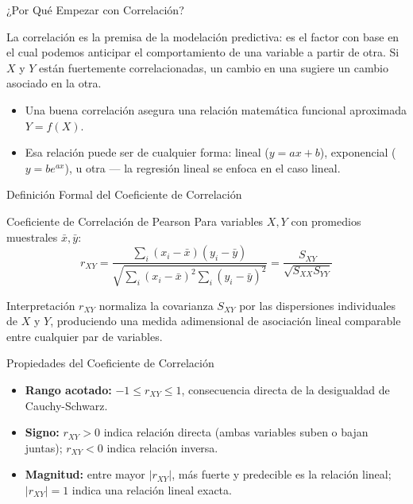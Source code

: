 \documentclass[10pt, aspectratio=169]{beamer}
\begin{document}
\begin{frame}{¿Por Qué Empezar con Correlación?}
  \footnotesize
  \begin{motivacion}
    La correlación es la premisa de la modelación predictiva: es el factor con base en el cual podemos anticipar el comportamiento de una variable a partir de otra. Si $X$ y $Y$ están fuertemente correlacionadas, un cambio en una sugiere un cambio asociado en la otra.
  \end{motivacion}

  \vspace{0.15cm}
  \pause
  \begin{itemize}\itemsep=0.1cm
    \item Una buena correlación asegura una relación matemática funcional aproximada $Y=f(X)$. \pause
    \item Esa relación puede ser de cualquier forma: lineal ($y=ax+b$), exponencial ($y=be^{ax}$), u otra --- la regresión lineal se enfoca en el caso lineal.
  \end{itemize}
\end{frame}

\begin{frame}{Definición Formal del Coeficiente de Correlación}
  \footnotesize
  \begin{block}{Coeficiente de Correlación de Pearson}
    Para variables $X,Y$ con promedios muestrales $\bar x,\bar y$:
    $$r_{XY}=\frac{\sum_i(x_i-\bar x)(y_i-\bar y)}{\sqrt{\sum_i(x_i-\bar x)^2\sum_i(y_i-\bar y)^2}}=\frac{S_{XY}}{\sqrt{S_{XX}S_{YY}}}$$
  \end{block}
  \pause

  \vspace{0.1cm}
  \begin{alertblock}{Interpretación}
    $r_{XY}$ normaliza la covarianza $S_{XY}$ por las dispersiones individuales de $X$ y $Y$, produciendo una medida adimensional de asociación lineal comparable entre cualquier par de variables.
  \end{alertblock}
\end{frame}

\begin{frame}{Propiedades del Coeficiente de Correlación}
  \footnotesize
  \begin{itemize}\itemsep=0.12cm
    \item \textbf{Rango acotado:} $-1\leq r_{XY}\leq1$, consecuencia directa de la desigualdad de Cauchy-Schwarz. \pause
    \item \textbf{Signo:} $r_{XY}>0$ indica relación directa (ambas variables suben o bajan juntas); $r_{XY}<0$ indica relación inversa. \pause
    \item \textbf{Magnitud:} entre mayor $|r_{XY}|$, más fuerte y predecible es la relación lineal; $|r_{XY}|=1$ indica una relación lineal exacta.
  \end{itemize}
\end{frame}
\end{document}
